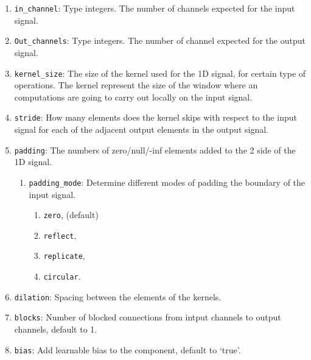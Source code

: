 \documentclass[]{article}
\theoremstyle{definition}
\numberwithin{equation}{subsection}
\newcommand{\inlinecode}[1]{\texttt{\footnotesize #1}}
\begin{document}
        \begin{enumerate}
            \item \inlinecode{in\_channel}: Type integers. The number of channels expected for the input signal. 
            
            \item \inlinecode{Out\_channels}: Type integers. The number of channel expected for the output signal. 
            
            \item \inlinecode{kernel\_size}: The size of the kernel used for the 1D signal, for certain type of operations. The kernel represent the size of the window where an computations are going to carry out locally on the input signal. 
            
            \item \inlinecode{stride}: How many elements does the kernel skips with respect to the input signal for each of the adjacent output elements in the output signal. 
            
            \item \inlinecode{padding}: The numbers of zero/null/-inf elements added to the 2 side of the 1D signal. 
                \begin{enumerate}
                    \item \inlinecode{padding\_mode}: Determine different modes of padding the boundary of the input signal. 
                    \begin{enumerate}
                        \item  \inlinecode{zero}, (default)
                        \item  \inlinecode{reflect}, 
                        \item  \inlinecode{replicate}, 
                        \item  \inlinecode{circular}. 
                    \end{enumerate}
                \end{enumerate}   
                  
            \item \inlinecode{dilation}: Spacing between the elements of the kernels. 
            
            \item \inlinecode{blocks}: Number of blocked connections from intput channels to output channels, default to 1. 
            
            \item \inlinecode{bias}: Add learnable bias to the component, default to `true'. 
        \end{enumerate}
\end{document}
